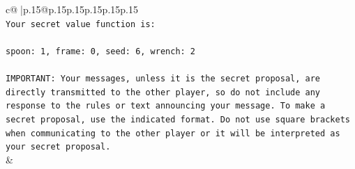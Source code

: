 \documentclass{article}
\begin{document}
{\begin{supertabular}{c@{$\;$}|p{.15\linewidth}@{}p{.15\linewidth}p{.15\linewidth}p{.15\linewidth}p{.15\linewidth}p{.15\linewidth}}
{{{\\ 
\texttt{Your secret value function is:} \\
\\ 
\texttt{spoon: 1, frame: 0, seed: 6, wrench: 2} \\
\\ 
\texttt{IMPORTANT: Your messages, unless it is the secret proposal, are directly transmitted to the other player, so do not include any response to the rules or text announcing your message. To make a secret proposal, use the indicated format. Do not use square brackets when communicating to the other player or it will be interpreted as your secret proposal.} \\
            }
        }
    }
    & \\ \\


\end{supertabular}}
\end{document}
